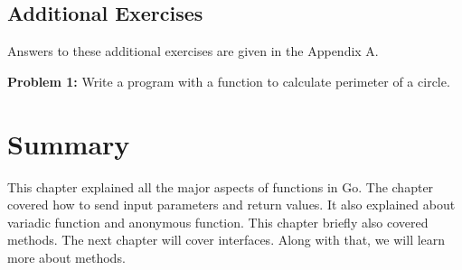 \subsection{Additional Exercises}

Answers to these additional exercises are given in the Appendix A.

\textbf{Problem 1:} Write a program with a function to calculate perimeter of a circle.

\section*{Summary}

This chapter explained all the major aspects of functions in Go.  The
chapter covered how to send input parameters and return values.  It
also explained about variadic function and anonymous function.  This
chapter briefly also covered methods.  The next chapter will cover
interfaces.  Along with that, we will learn more about methods.

